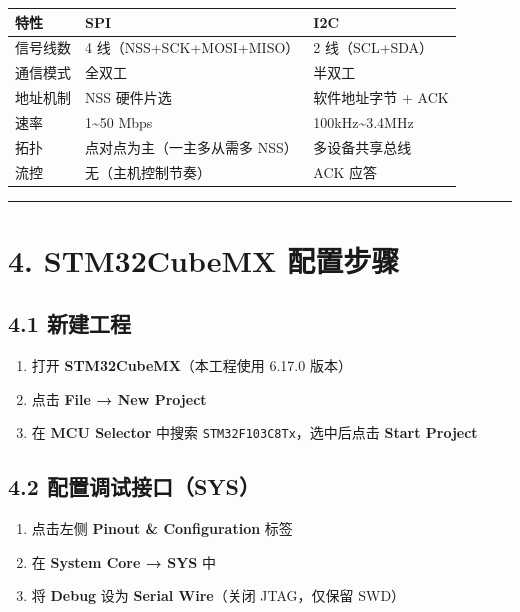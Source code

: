 \documentclass[
  chinese,
  UTF8,
  oneside,
  openany]{ctexbook}
\providecommand{\tightlist}{%
  \setlength{\itemsep}{0pt}\setlength{\parskip}{0pt}}
\begin{document}
\begin{longtable}[]{@{}lll@{}}
\toprule\noalign{}
特性 & SPI & I2C \\
\midrule\noalign{}
\endhead
\bottomrule\noalign{}
\endlastfoot
信号线数 & 4 线（NSS+SCK+MOSI+MISO） & 2 线（SCL+SDA） \\
通信模式 & 全双工 & 半双工 \\
地址机制 & NSS 硬件片选 & 软件地址字节 + ACK \\
速率 & 1\textasciitilde50 Mbps & 100kHz\textasciitilde3.4MHz \\
拓扑 & 点对点为主（一主多从需多 NSS） & 多设备共享总线 \\
流控 & 无（主机控制节奏） & ACK 应答 \\
\end{longtable}

\begin{center}\rule{0.5\linewidth}{0.5pt}\end{center}

\section{4. STM32CubeMX
配置步骤}\label{stm32cubemx-ux914dux7f6eux6b65ux9aa4-5}

\subsection{4.1 新建工程}\label{ux65b0ux5efaux5de5ux7a0b-4}

\begin{enumerate}
\def\labelenumi{\arabic{enumi}.}
\tightlist
\item
  打开 \textbf{STM32CubeMX}（本工程使用 6.17.0 版本）
\item
  点击 \textbf{File → New Project}
\item
  在 \textbf{MCU Selector} 中搜索 \texttt{STM32F103C8Tx}，选中后点击
  \textbf{Start Project}
\end{enumerate}

\subsection{4.2
配置调试接口（SYS）}\label{ux914dux7f6eux8c03ux8bd5ux63a5ux53e3sys-5}

\begin{enumerate}
\def\labelenumi{\arabic{enumi}.}
\tightlist
\item
  点击左侧 \textbf{Pinout \& Configuration} 标签
\item
  在 \textbf{System Core → SYS} 中
\item
  将 \textbf{Debug} 设为 \textbf{Serial Wire}（关闭 JTAG，仅保留 SWD）
\end{enumerate}
\end{document}

